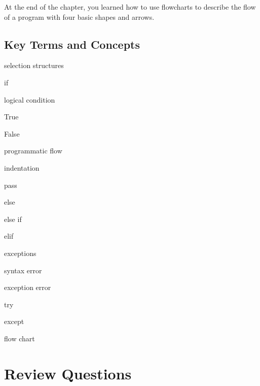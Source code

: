 \documentclass{book}
\newenvironment{key_terms}{\begin{multicols}{3}}{\end{multicols}} %
\begin{document}
At the end of the chapter, you learned how to use flowcharts to describe
the flow of a program with four basic shapes and arrows.
    




    
        \hypertarget{key-terms-and-concepts}{%
\subsection{Key Terms and Concepts}\label{key-terms-and-concepts}}
    




    
        \begin{key_terms}
        selection structures

if

logical condition

True

False

programmatic flow

indentation

pass

else

else if

elif

exceptions

syntax error

exception error

try

except

flow chart
        \end{key_terms}

    




    
        \hypertarget{review-questions}{%
\section{Review Questions}\label{review-questions}}
    
\end{document}
